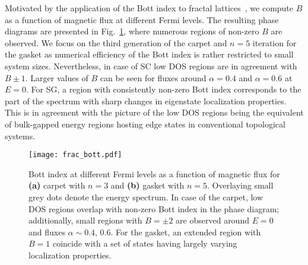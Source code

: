Motivated by the application of the Bott index to fractal lattices~\cite{2018:BHZ}, we compute $B$ as a function of magnetic flux at different Fermi levels. The resulting phase diagrams are presented in Fig.~\ref{fig:bott_idx}, where numerous regions of non-zero $B$ are observed. We focus on the third generation of the carpet and $n =5$ iteration for the gasket as numerical efficiency of the Bott index is rather restricted to small system sizes. Nevertheless, in case of SC low DOS regions are in agreement with $B \pm 1$. Larger values of $B$ can be seen for fluxes around $ \alpha = 0.4 $ and $\alpha = 0.6$ at $E = 0$. For SG, a region with consistently non-zero Bott index corresponds to the part of the spectrum with sharp changes in eigenstate localization properties. This is in agreement with the picture of the low DOS regions being the equivalent of bulk-gapped energy regions hosting edge states in conventional topological systems.

\begin{figure}[H]
\centering
\texttt{[image: frac\_bott.pdf]}
\caption[Bott index at different Fermi levels as a function of magnetic flux]{Bott index at different Fermi levels as a function of magnetic flux for \textbf{(a)} carpet with $n = 3$ and \textbf{(b)} gasket with $n = 5$. Overlaying small grey dots denote the energy spectrum. In case of the carpet, low DOS regions overlap with non-zero Bott index in the phase diagram; additionally, small regions with $B = \pm 2$ are observed around $E = 0$ and fluxes $\alpha \sim 0.4, \, 0.6$. For the gasket, an extended region with $B = 1$ coincide with a set of states having largely varying localization properties.}
\label{fig:bott_idx}
\end{figure}

